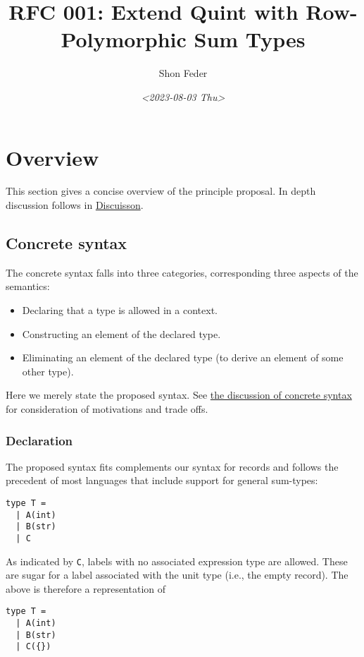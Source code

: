\documentclass[11pt]{article}
\author{Shon Feder}
\date{\textit{<2023-08-03 Thu>}}
\title{RFC 001: Extend Quint with Row-Polymorphic Sum Types}
\begin{document}
\maketitle
\tableofcontents


\section{Overview}
\label{sec:orgabf3583}
This section gives a concise overview of the principle proposal. In
depth discussion follows in \hyperref[sec:org050246d]{Discuisson}.

\subsection{Concrete syntax}
\label{sec:orga6e64d7}
The concrete syntax falls into three categories, corresponding three aspects of
the semantics:

\begin{itemize}
\item Declaring that a type is allowed in a context.
\item Constructing an element of the declared type.
\item Eliminating an element of the declared type (to derive an element of some
other type).
\end{itemize}

Here we merely state the proposed syntax. See \hyperref[sec:orgb377490]{the discussion of concrete syntax}
for consideration of motivations and trade offs.

\subsubsection{Declaration}
\label{sec:orgf216e02}
The proposed syntax fits complements our syntax for records and follows the
precedent of most languages that include support for general sum-types:

\begin{verbatim}
type T =
  | A(int)
  | B(str)
  | C
\end{verbatim}

As indicated by \texttt{C}, labels with no associated expression type are allowed.
These are sugar for a label associated with the unit type (i.e., the empty
record). The above is therefore a representation of

\begin{verbatim}
type T =
  | A(int)
  | B(str)
  | C({})
\end{verbatim}
\end{document}
